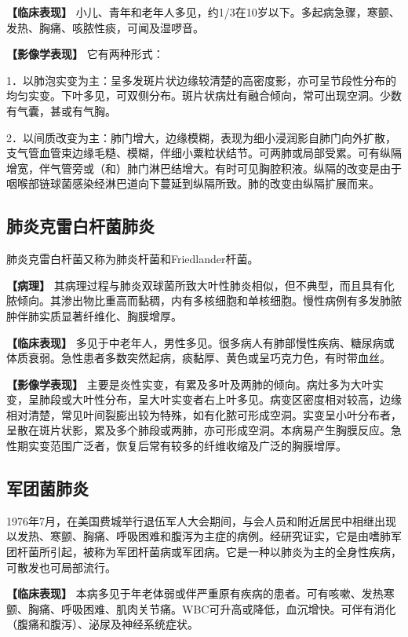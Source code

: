 \textbf{【临床表现】}
小儿、青年和老年人多见，约1/3在10岁以下。多起病急骤，寒颤、发热、胸痛、咳脓性痰，可闻及湿啰音。

\textbf{【影像学表现】} 它有两种形式：

1．以肺泡实变为主：呈多发斑片状边缘较清楚的高密度影，亦可呈节段性分布的均匀实变。下叶多见，可双侧分布。斑片状病灶有融合倾向，常可出现空洞。少数有气囊，甚或有气胸。

2．以间质改变为主：肺门增大，边缘模糊，表现为细小浸润影自肺门向外扩散，支气管血管束边缘毛糙、模糊，伴细小粟粒状结节。可两肺或局部受累。可有纵隔增宽，伴气管旁或（和）肺门淋巴结增大。有时可见胸腔积液。纵隔的改变是由于咽喉部链球菌感染经淋巴道向下蔓延到纵隔所致。肺的改变由纵隔扩展而来。

\subsection{肺炎克雷白杆菌肺炎}

肺炎克雷白杆菌又称为肺炎杆菌和Friedlander杆菌。

\textbf{【病理】}
其病理过程与肺炎双球菌所致大叶性肺炎相似，但不典型，而且具有化脓倾向。其渗出物比重高而黏稠，内有多核细胞和单核细胞。慢性病例有多发肺脓肿伴肺实质显著纤维化、胸膜增厚。

\textbf{【临床表现】}
多见于中老年人，男性多见。很多病人有肺部慢性疾病、糖尿病或体质衰弱。急性患者多数突然起病，痰黏厚、黄色或呈巧克力色，有时带血丝。

\textbf{【影像学表现】}
主要是炎性实变，有累及多叶及两肺的倾向。病灶多为大叶实变，呈肺段或大叶性分布，呈大叶实变者右上叶多见。病变区密度相对较高，边缘相对清楚，常见叶间裂膨出较为特殊，如有化脓可形成空洞。实变呈小叶分布者，呈散在斑片状影，累及多个肺段或两肺，亦可形成空洞。本病易产生胸膜反应。急性期实变范围广泛者，恢复后常有较多的纤维收缩及广泛的胸膜增厚。

\subsection{军团菌肺炎}

1976年7月，在美国费城举行退伍军人大会期间，与会人员和附近居民中相继出现以发热、寒颤、胸痛、呼吸困难和腹泻为主症的病例。经研究证实，它是由嗜肺军团杆菌所引起，被称为军团杆菌病或军团病。它是一种以肺炎为主的全身性疾病，可散发也可局部流行。

\textbf{【临床表现】}
本病多见于年老体弱或伴严重原有疾病的患者。可有咳嗽、发热寒颤、胸痛、呼吸困难、肌肉关节痛。WBC可升高或降低，血沉增快。可伴有消化（腹痛和腹泻）、泌尿及神经系统症状。

